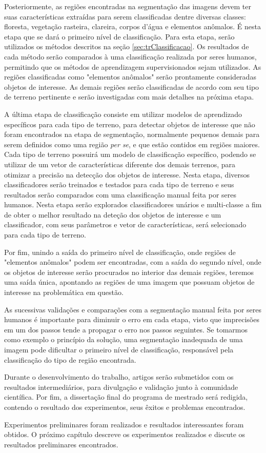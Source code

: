 Posteriormente, as regiões encontradas na segmentação das imagens devem ter suas características extraídas para serem classificadas dentre diversas classes: floresta, vegetação rasteira, clareira, corpos d'água e elementos anômalos. É nesta etapa que se dará o primeiro nível de classificação. Para esta etapa, serão utilizados os métodos descritos na seção \ref{sec:trClassificacao}. Os resultados de cada método serão comparados à uma classificação realizada por seres humanos, permitindo que os métodos de aprendizagem supervisionados sejam utilizados. As regiões classificadas como "elementos anômalos" serão prontamente consideradas objetos de interesse. As demais regiões serão classificadas de acordo com seu tipo de terreno pertinente e serão investigadas com mais detalhes na próxima etapa.

A última etapa de classificação consiste em utilizar modelos de aprendizado específicos para cada tipo de terreno, para detectar objetos de interesse que não foram encontrados na etapa de segmentação, normalmente pequenos demais para serem definidos como uma região \textit{per se}, e que estão contidos em regiões maiores. Cada tipo de terreno possuirá um modelo de classificação específico, podendo se utilizar de um vetor de características diferente dos demais terrenos, para otimizar a precisão na detecção dos objetos de interesse. Nesta etapa, diversos classificadores serão treinados e testados para cada tipo de terreno e seus resultados serão comparados com uma classificação manual feita por seres humanos. Nesta etapa serão explorados classificadores unários e multi-classe a fim de obter o melhor resultado na deteção dos objetos de interesse e um classificador, com seus parâmetros e vetor de características, será selecionado para cada tipo de terreno.

Por fim, unindo a saída do primeiro nível de classificação, onde regiões de "elementos anômalos" podem ser encontradas, com a saída do segundo nível, onde os objetos de interesse serão procurados no interior das demais regiões, teremos uma saída única, apontando as regiões de uma imagem que possuam objetos de interesse na problemática em questão.

As sucessivas validações e comparações com a segmentação manual feita por seres humanos é importante para diminuir o erro em cada etapa, visto que imprecisões em um dos passos tende a propagar o erro nos passos seguintes. Se tomarmos como exemplo o princípio da solução, uma segmentação inadequada de uma imagem pode dificultar o primeiro nível de classificação, responsável pela classificação do tipo de região encontrada.

Durante o desenvolvimento do trabalho, artigos serão submetidos com os resultados intermediários, para divulgação e validação junto à comunidade científica. Por fim, a dissertação final do programa de mestrado será redigida, contendo o resultado dos experimentos, seus êxitos e problemas encontrados.

Experimentos preliminares foram realizados e resultados interessantes foram obtidos. O próximo capítulo descreve os experimentos realizados e discute os resultados preliminares encontrados.